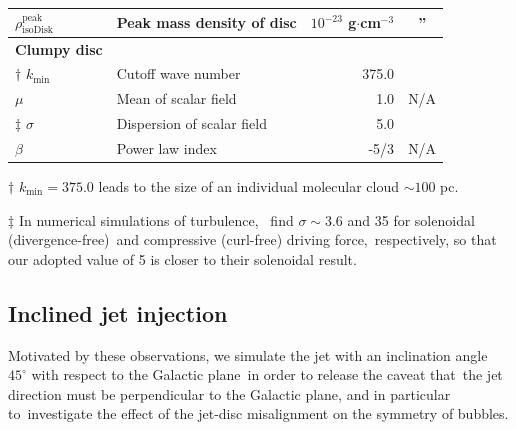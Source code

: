 \documentclass[twocolumn]{aastex631}
\begin{document}
\begin{table}[t]
\begin{tabular}{@{}llrc@{}}
$\rho_{\text{isoDisk}}^{\text{peak}}$ & Peak mass density of disc                 & $10^{-23}$ g$\cdot$cm$^{-3}$         & \multicolumn{1}{c}{''}         \\ \hline
{\bf Clumpy disc }                    &                                           &                                      &                                \\
$\dagger$  $k_{\text{min}}$           & Cutoff wave number                        & 375.0                                & \citep{peak-ism-density}       \\
$\mu$                                 & Mean of scalar field                      & 1.0                                  &   N/A                          \\
$\ddag$  $\sigma$                     & Dispersion of scalar field                & 5.0                                  & \citep{Federrath2010}          \\
$\beta$                               & Power law index                           & -5/3                                 &   N/A                          \\ \midrule
\end{tabular}
\begin{tablenotes}
      \raggedright
      \item  $\dagger$  $k_{\text{min}}=375.0$ leads to the size of an individual molecular cloud $\sim 100$ pc.
      \item  $\ddag$ In numerical simulations of turbulence,\
             \citet{Federrath2010} find $\sigma\sim 3.6$ and 35 for solenoidal (divergence-free)\
             and compressive (curl-free) driving force,\
             respectively, so that our adopted value of 5 is closer to their solenoidal result.
    \end{tablenotes}
\end{table}


%

\subsection{Inclined jet injection}

  Motivated by these observations, we simulate the jet with an inclination angle\
  $45^{\circ}$ with respect to the Galactic plane\
  in order to release the caveat that\
  the jet direction must be perpendicular to the Galactic plane, and in particular to\
  investigate the effect of the jet-disc misalignment on the symmetry of bubbles.
\end{document}
